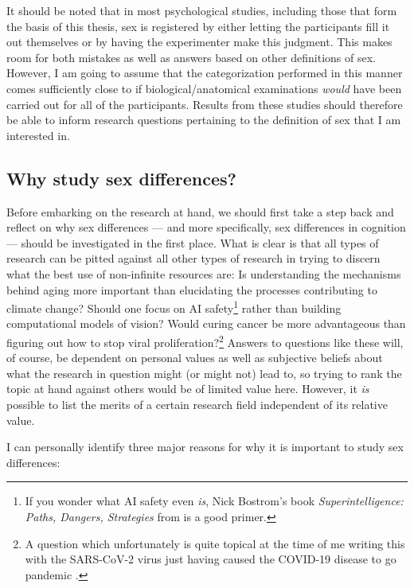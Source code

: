 It should be noted that in most psychological studies, including those that form the basis of this thesis, sex is registered by either letting the participants fill it out themselves or by having the experimenter make this judgment. This makes room for both mistakes as well as answers based on other definitions of sex. However, I am going to assume that the categorization performed in this manner comes sufficiently close to if biological/anatomical examinations \emph{would} have been carried out for all of the participants. Results from these studies should therefore be able to inform research questions pertaining to the definition of sex that I am interested in.

\subsection{Why study sex differences?} \label{Why_study_sex?}

Before embarking on the research at hand, we should first take a step back and reflect on why sex differences --- and more specifically, sex differences in cognition --- should be investigated in the first place. What is clear is that all types of research can be pitted against all other types of research in trying to discern what the best use of non-infinite resources are: Is understanding the mechanisms behind aging more important than elucidating the processes contributing to climate change? Should one focus on AI safety\footnote{If you wonder what AI safety even \emph{is}, Nick Bostrom's book \emph{Superintelligence: Paths, Dangers, Strategies} from \citeyear{Bostrom2014} is a good primer.} rather than building computational models of vision? Would curing cancer be more advantageous than figuring out how to stop viral proliferation?\footnote{A question which unfortunately is quite topical at the time of me writing this with the SARS-CoV-2 virus just having caused the COVID-19 disease to go pandemic \parencite{WHO2020}.} Answers to questions like these will, of course, be dependent on personal values as well as subjective beliefs about what the research in question might (or might not) lead to, so trying to rank the topic at hand against others would be of limited value here. However, it \emph{is} possible to list the merits of a certain research field independent of its relative value.

I can personally identify three major reasons for why it is important to study sex differences:

